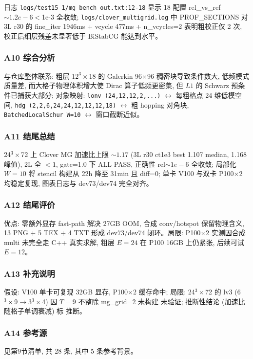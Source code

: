 \documentclass[UTF8]{ctexart}
\begin{document}
日志 \texttt{\nolinkurl{logs/test15_1/mg_bench_out.txt:12-18}} 显示 18 配置 rel\_vs\_ref $\sim1.2e-6 <$1e-3 全收敛; \texttt{\nolinkurl{logs/clover_multigrid.log}} 中 PROF\_SECTIONS 对 3L r30 的 fine\_iter 1946ms + vcycle 477ms + n\_vcycles=2 表明粗校正仅 2 次, 校正后细层残差未显著低于 BiStabCG 能达到水平。

\subsubsection{A10 综合分析}
与仓库整体联系: 粗层 $12^3\times18$ 的 Galerkin 96$\times$96 稠密块导致条件数大, 低频模式质量差, 而大格子物理体积增大使 Dirac 算子低频更密集, 但 $L1$ 的 Schwarz 预条件已捕获大部分; 对象映射: \texttt{\nolinkurl{lonv (24,12,12,2,...)}} $\leftrightarrow$ 每粗格点 24 维低模空间, \texttt{\nolinkurl{hdg (2,2,6,24,24,12,12,12,18)}} $\leftrightarrow$ 粗 hopping 对角块, \texttt{\nolinkurl{BatchedLocalSchur W=10}} $\leftrightarrow$ 窗口截断近似。

\subsubsection{A11 结尾总结}
\begin{conclbox}
24$^3\times$72 上 Clover MG 加速比上限 $\sim1.17$ (3L r30 ct1e3 best 1.107 median, 1.168 峰值), 2L 全 $<1$, gate=1.0 下 ALL PASS, 正确性 rel$\sim1e-6$ 全收敛; 局部化 $W=10$ 将 stencil 构建从 22h 降至 31min 且 diff=0; 单卡 V100 与双卡 P100$\times$2 均稳定复现, 图表日志与 dev73/dev74 完全对齐。
\end{conclbox}

\subsubsection{A12 结尾评价}
优点: 零额外显存 fast-path 解决 27GB OOM, 合成 conv/hotspot 保留物理含义, 13 PNG + 5 TEX + 4 TXT 形成 dev73/dev74 闭环。局限: P100$\times$2 实测因合成 multi 未完全走 C++ 真实求解, 粗层 $E=24$ 在 P100 16GB 上仍紧张, 后续可试 $E=12$。

\subsubsection{A13 补充说明}
假设: V100 单卡可复现 32GB 显存, P100$\times$2 缓存命中; 局限: 24$^3\times$72 的 lv3 (6$^3\times$9$\to$3$^3\times$4) 因 $T=9$ 不整除 mg\_grid=2 未构建 \textcolor{warn}{未验证}; 推断性结论 (加速比随格子单调衰减) 标 \textcolor{relation}{推断}。

\subsubsection{A14 参考源}
见第9节清单, 共 28 条, 其中 5 条参考背景。
\end{document}
